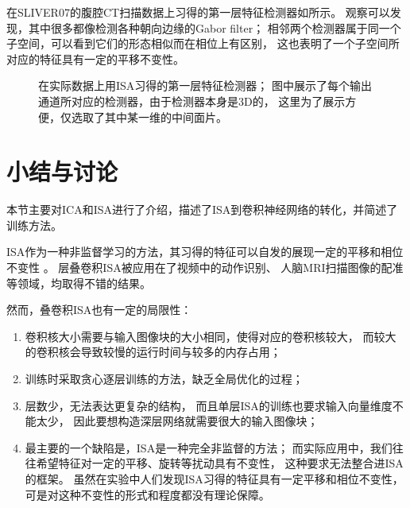 在SLIVER07的腹腔CT扫描数据上习得的第一层特征检测器如所示。
观察可以发现，其中很多都像检测各种朝向边缘的Gabor filter；
相邻两个检测器属于同一个子空间，可以看到它们的形态相似而在相位上有区别，
这也表明了一个子空间所对应的特征具有一定的平移不变性。

\begin{figure}[h!]
    \caption{在实际数据上用ISA习得的第一层特征检测器；
        图中展示了每个输出通道所对应的检测器，由于检测器本身是3D的，
        这里为了展示方便，仅选取了其中某一维的中间面片。}
    \label{fig:isa:filter}
\end{figure}


\section{小结与讨论\label{sec:ISA:discuss}}
本节主要对ICA和ISA进行了介绍，描述了ISA到卷积神经网络的转化，并简述了训练方法。

ISA作为一种非监督学习的方法，其习得的特征可以自发的展现一定的平移和相位不变性
\cite{hyvarinen2000emergence}。
层叠卷积ISA被应用在了视频中的动作识别\cite{le2011learning}、
人脑MRI扫描图像的配准\cite{wu2013unsupervised}等领域，均取得不错的结果。

然而，叠卷积ISA也有一定的局限性：
\begin{enumerate}
    \item 卷积核大小需要与输入图像块的大小相同，使得对应的卷积核较大，
        而较大的卷积核会导致较慢的运行时间与较多的内存占用；
    \item 训练时采取贪心逐层训练的方法，缺乏全局优化的过程；
    \item 层数少，无法表达更复杂的结构，
        而且单层ISA的训练也要求输入向量维度不能太少，
        因此要想构造深层网络就需要很大的输入图像块；
    \item 最主要的一个缺陷是，ISA是一种完全非监督的方法；
        而实际应用中，我们往往希望特征对一定的平移、旋转等扰动具有不变性，
        这种要求无法整合进ISA的框架。
        虽然在实验中人们发现ISA习得的特征具有一定平移和相位不变性，
        可是对这种不变性的形式和程度都没有理论保障。
\end{enumerate}

